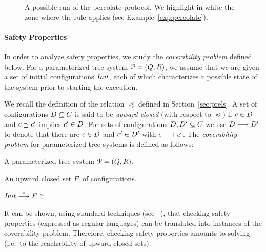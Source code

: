 \begin{figure}
%
%
\caption{A possible run of the percolate protocol. 
%
We highlight in white the zone where the rule applies 
%
(see Example~\ref{exp:percolate}).}
\label{fig:percolate:execution}
\end{figure}
%

\paragraph{\bf Safety Properties}
%
In order to analyze safety properties, we study the \emph{coverability problem} defined 
below.
%
For a parameterized tree system ${\EuScript P}=\left(Q,R\right)$, we assume that we are given a set 
of initial configurations ${\it Init}$, each of which characterizes a possible state of the system 
prior to starting the execution.
%

We recall the definition of the relation $\preceq$ defined in Section~\ref{sec:prels}.
%
A set of configurations $D\subseteq C$ is said to be \emph{upward closed} 
(with respect to $\preceq$) if $c\in D$ and $c\preceq c'$ implies $c'\in D$.
%
For sets of configurations $D,D'\subseteq C$ we use $D\stackrel{}\longrightarrow D'$ to denote that 
there are $c\in D$ and $c'\in D'$ with $c\stackrel{}\longrightarrow c'$.
%
The \emph{coverability problem} for parameterized tree systems is defined as follows:
%

\probbox{\covproblem}
{%
  \item A parameterized tree system ${\EuScript P}=\left(Q,R\right)$.
  \item An upward closed set $F$ of configurations.
}{%
${\it Init}\stackrel{*}\longrightarrow{}F$ ?
}
%

It can be shown, using standard techniques (see ~\cite{VW:modelchecking,GoWo:safety}),
that checking safety properties (expressed as regular languages) can be translated into instances 
of the coverability problem.
%
Therefore, checking safety properties amounts to solving \covproblem{} (i.e.\ to the reachability 
of upward closed sets).
%
